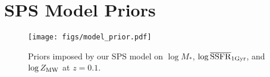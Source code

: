 \section{SPS Model Priors} \label{sec:model_priors}
\begin{figure}
\begin{center}
\texttt{[image: figs/model\_prior.pdf]}
    \caption{
    Priors imposed by our SPS model on $\log M_*$, 
    $\log \overline{\rm SSFR}_{\rm 1 Gyr}$, and $\log Z_{\rm MW}$ at $z=0.1$. 
    }
\label{fig:model_prior}
\end{center}
\end{figure}
